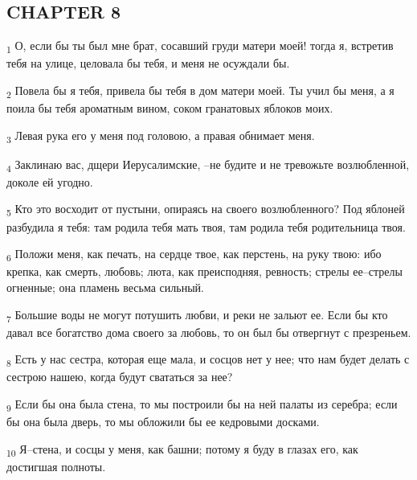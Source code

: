 \subsection{CHAPTER 8}
\begin{tcolorbox}
\textsubscript{1} О, если бы ты был мне брат, сосавший груди матери моей! тогда я, встретив тебя на улице, целовала бы тебя, и меня не осуждали бы.
\end{tcolorbox}
\begin{tcolorbox}
\textsubscript{2} Повела бы я тебя, привела бы тебя в дом матери моей. Ты учил бы меня, а я поила бы тебя ароматным вином, соком гранатовых яблоков моих.
\end{tcolorbox}
\begin{tcolorbox}
\textsubscript{3} Левая рука его у меня под головою, а правая обнимает меня.
\end{tcolorbox}
\begin{tcolorbox}
\textsubscript{4} Заклинаю вас, дщери Иерусалимские, --не будите и не тревожьте возлюбленной, доколе ей угодно.
\end{tcolorbox}
\begin{tcolorbox}
\textsubscript{5} Кто это восходит от пустыни, опираясь на своего возлюбленного? Под яблоней разбудила я тебя: там родила тебя мать твоя, там родила тебя родительница твоя.
\end{tcolorbox}
\begin{tcolorbox}
\textsubscript{6} Положи меня, как печать, на сердце твое, как перстень, на руку твою: ибо крепка, как смерть, любовь; люта, как преисподняя, ревность; стрелы ее--стрелы огненные; она пламень весьма сильный.
\end{tcolorbox}
\begin{tcolorbox}
\textsubscript{7} Большие воды не могут потушить любви, и реки не зальют ее. Если бы кто давал все богатство дома своего за любовь, то он был бы отвергнут с презреньем.
\end{tcolorbox}
\begin{tcolorbox}
\textsubscript{8} Есть у нас сестра, которая еще мала, и сосцов нет у нее; что нам будет делать с сестрою нашею, когда будут свататься за нее?
\end{tcolorbox}
\begin{tcolorbox}
\textsubscript{9} Если бы она была стена, то мы построили бы на ней палаты из серебра; если бы она была дверь, то мы обложили бы ее кедровыми досками.
\end{tcolorbox}
\begin{tcolorbox}
\textsubscript{10} Я--стена, и сосцы у меня, как башни; потому я буду в глазах его, как достигшая полноты.
\end{tcolorbox}
